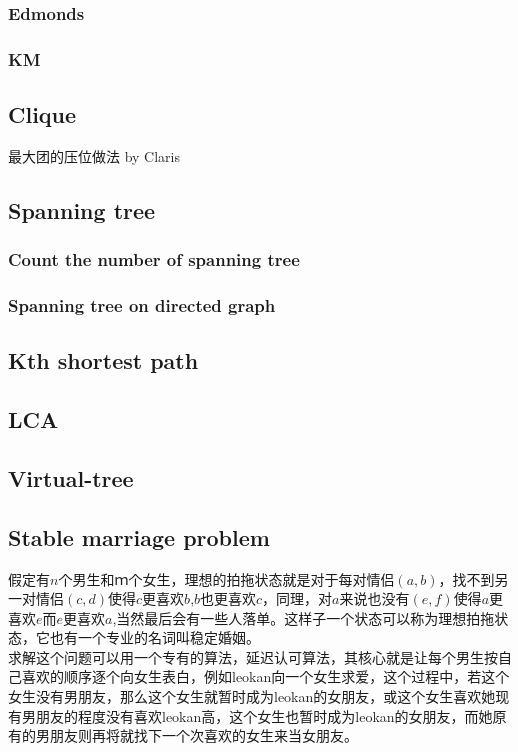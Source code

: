 \subsubsection{Edmonds}

\subsubsection{KM}


\subsection{Clique}


最大团的压位做法 by Claris \\



\subsection{Spanning tree}
\subsubsection{Count the number of spanning tree}

\subsubsection{Spanning tree on directed graph}


\subsection{Kth shortest path}

\subsection{LCA}

\subsection{Virtual-tree}

\subsection{Stable marriage problem}
	假定有$n$个男生和$ｍ$个女生，理想的拍拖状态就是对于每对情侣$(a,b)$，找不到另一对情侣$(c,d)$使得$c$更喜欢$b$,$b$也更喜欢$c$，同理，对$a$来说也没有$(e,f)$使得$a$更喜欢$e$而$e$更喜欢$a$,当然最后会有一些人落单。这样子一个状态可以称为理想拍拖状态，它也有一个专业的名词叫稳定婚姻。\\
	求解这个问题可以用一个专有的算法，延迟认可算法，其核心就是让每个男生按自己喜欢的顺序逐个向女生表白，例如leokan向一个女生求爱，这个过程中，若这个女生没有男朋友，那么这个女生就暂时成为leokan的女朋友，或这个女生喜欢她现有男朋友的程度没有喜欢leokan高，这个女生也暂时成为leokan的女朋友，而她原有的男朋友则再将就找下一个次喜欢的女生来当女朋友。



